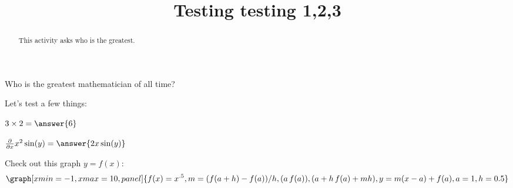 \documentclass{ximera}
\title{Testing testing 1,2,3}
\begin{document}
      
\begin{abstract}
      
This activity asks who is the greatest.
      
\end{abstract}
      
\maketitle
      
      
      
\begin{question}
      
  Who is the greatest mathematician of all time?
      
  \begin{multipleChoice}
      
      
    



    
      
  \end{multipleChoice}
      
\end{question}      

Let's test a few things:

\begin{question}
 
$3\times 2 = \answer{6}$
 
\end{question}

\begin{question}
 
         $ \frac{\partial}{\partial x} x^2\sin(y) =  \answer{2x\sin(y)}$
 
    \end{question}


 \begin{onlineOnly}
   Check out this graph $y=f(x)$:
   $$\graph[xmin=-1,xmax=10, panel]{f(x)=x^{.5},m=(f(a+h)-f(a))/h,(a\, f(a)), (a+h\, f(a)+mh), y=m(x-a)+f(a), a=1, h=0.5}$$

 \end{onlineOnly}
\end{document}
